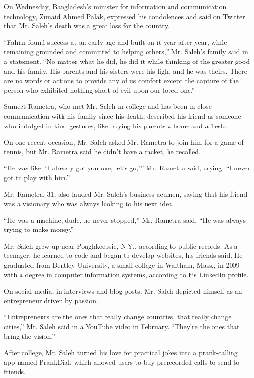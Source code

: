 On Wednesday, Bangladesh's minister for information and communication
technology, Zunaid Ahmed Palak, expressed his condolences and
\href{https://twitter.com/zapalak/status/1283340969111203842}{said on
Twitter} that Mr. Saleh's death was a great loss for the country.

``Fahim found success at an early age and built on it year after year,
while remaining grounded and committed to helping others,'' Mr. Saleh's
family said in a statement. ``No matter what he did, he did it while
thinking of the greater good and his family. His parents and his sisters
were his light and he was theirs. There are no words or actions to
provide any of us comfort except the capture of the person who exhibited
nothing short of evil upon our loved one.''

Sumeet Rametra, who met Mr. Saleh in college and has been in close
communication with his family since his death, described his friend as
someone who indulged in kind gestures, like buying his parents a home
and a Tesla.

On one recent occasion, Mr. Saleh asked Mr. Rametra to join him for a
game of tennis, but Mr. Rametra said he didn't have a racket, he
recalled.

``He was like, `I already got you one, let's go,''' Mr. Rametra said,
crying. ``I never got to play with him.''

Mr. Rametra, 31, also lauded Mr. Saleh's business acumen, saying that
his friend was a visionary who was always looking to his next idea.

``He was a machine, dude, he never stopped,'' Mr. Rametra said. ``He was
always trying to make money.''

Mr. Saleh grew up near Poughkeepsie, N.Y., according to public records.
As a teenager, he learned to code and began to develop websites, his
friends said. He graduated from Bentley University, a small college in
Waltham, Mass., in 2009 with a degree in computer information systems,
according to his LinkedIn profile.

On social media, in interviews and blog posts, Mr. Saleh depicted
himself as an entrepreneur driven by passion.

``Entrepreneurs are the ones that really change countries, that really
change cities,'' Mr. Saleh said in a YouTube video in February.
``They're the ones that bring the vision.''

After college, Mr. Saleh turned his love for practical jokes into a
prank-calling app named PrankDial, which allowed users to buy
prerecorded calls to send to friends.

